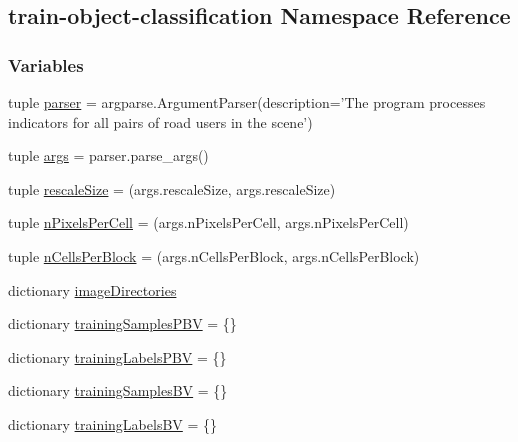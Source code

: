 \hypertarget{namespacetrain-object-classification}{\subsection{train-\/object-\/classification Namespace Reference}
\label{namespacetrain-object-classification}
}
\subsubsection*{Variables}
\begin{DoxyCompactItemize}
\item 
tuple \hyperlink{namespacetrain-object-classification_a0faae7a7d395697b060e823d04219e0f}{parser} = argparse.\-Argument\-Parser(description='The program processes indicators for all pairs of road users in the scene')
\item 
tuple \hyperlink{namespacetrain-object-classification_afa7a28d301302f6bd37de924c64b1bdc}{args} = parser.\-parse\-\_\-args()
\item 
tuple \hyperlink{namespacetrain-object-classification_a7445c2ad53d94011d88eb28e071bf238}{rescale\-Size} = (args.\-rescale\-Size, args.\-rescale\-Size)
\item 
tuple \hyperlink{namespacetrain-object-classification_a87883a27239630d0a9c47fca467213f7}{n\-Pixels\-Per\-Cell} = (args.\-n\-Pixels\-Per\-Cell, args.\-n\-Pixels\-Per\-Cell)
\item 
tuple \hyperlink{namespacetrain-object-classification_a5e2d196faf72ea32e18f7ad46a1dc137}{n\-Cells\-Per\-Block} = (args.\-n\-Cells\-Per\-Block, args.\-n\-Cells\-Per\-Block)
\item 
dictionary \hyperlink{namespacetrain-object-classification_ae0d18afa9685e4a46f18d0d05bdc2b2a}{image\-Directories}
\item 
dictionary \hyperlink{namespacetrain-object-classification_a7c37289cd9dacd3d8ee80ad55837eef1}{training\-Samples\-P\-B\-V} = \{\}
\item 
dictionary \hyperlink{namespacetrain-object-classification_aa958fd7d4e72aebaf8bde4baf7069c36}{training\-Labels\-P\-B\-V} = \{\}
\item 
dictionary \hyperlink{namespacetrain-object-classification_a6762d7395185b12823ca29a8e90ef492}{training\-Samples\-B\-V} = \{\}
\item 
dictionary \hyperlink{namespacetrain-object-classification_aebca87b0b579e8a4386bb6af75a526c0}{training\-Labels\-B\-V} = \{\}
\item 

\end{DoxyCompactItemize}
